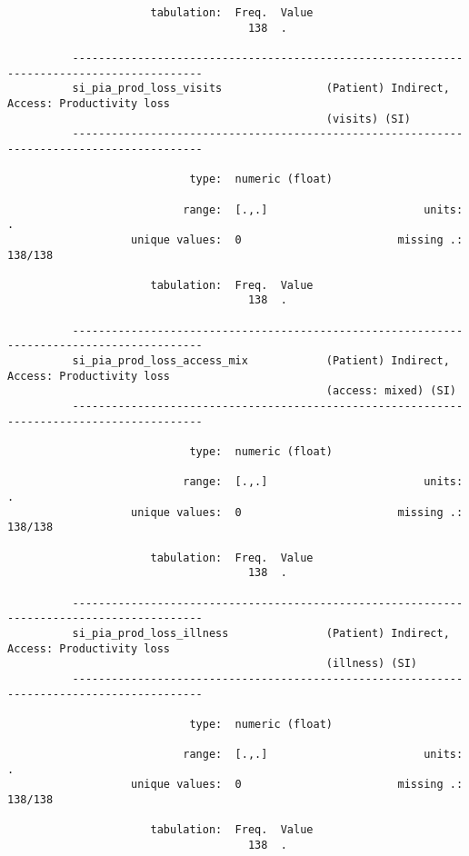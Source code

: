 \documentclass{article}
\begin{document}
\begin{verbatim}
                      tabulation:  Freq.  Value
                                     138  .
          
          ------------------------------------------------------------------------------------------
          si_pia_prod_loss_visits                (Patient) Indirect, Access: Productivity loss
                                                 (visits) (SI)
          ------------------------------------------------------------------------------------------
          
                            type:  numeric (float)
          
                           range:  [.,.]                        units:  .
                   unique values:  0                        missing .:  138/138
          
                      tabulation:  Freq.  Value
                                     138  .
          
          ------------------------------------------------------------------------------------------
          si_pia_prod_loss_access_mix            (Patient) Indirect, Access: Productivity loss
                                                 (access: mixed) (SI)
          ------------------------------------------------------------------------------------------
          
                            type:  numeric (float)
          
                           range:  [.,.]                        units:  .
                   unique values:  0                        missing .:  138/138
          
                      tabulation:  Freq.  Value
                                     138  .
          
          ------------------------------------------------------------------------------------------
          si_pia_prod_loss_illness               (Patient) Indirect, Access: Productivity loss
                                                 (illness) (SI)
          ------------------------------------------------------------------------------------------
          
                            type:  numeric (float)
          
                           range:  [.,.]                        units:  .
                   unique values:  0                        missing .:  138/138
          
                      tabulation:  Freq.  Value
                                     138  .
          

\end{verbatim}
\end{document}
